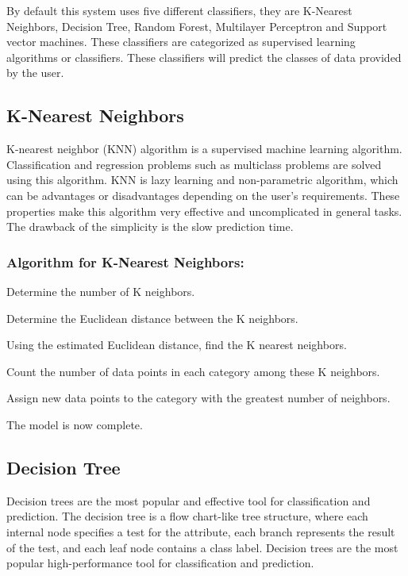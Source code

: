 By default this system uses five different classifiers, they are K-Nearest Neighbors, Decision Tree, Random Forest, Multilayer Perceptron and Support vector machines. These classifiers are categorized as supervised learning algorithms or classifiers. These classifiers will predict the classes of data provided by the user.

\subsection{K-Nearest Neighbors} \label{subsec:K_nearest_neighbors}

K-nearest neighbor (KNN) algorithm is a supervised machine learning algorithm. Classification and regression problems such as multiclass problems are solved using this algorithm. KNN is lazy learning and non-parametric algorithm, which can be advantages or disadvantages depending on the user's requirements. These properties make this algorithm very effective and uncomplicated in general tasks. The drawback of the simplicity is the slow prediction time.

\subsubsection{Algorithm for K-Nearest Neighbors:}
\begin{steps}
  \vspace{-0.5em}
  \setlength{\itemsep}{-0.2em}
  \item Determine the number of K neighbors.
  \item Determine the Euclidean distance between the K neighbors.
  \item Using the estimated Euclidean distance, find the K nearest neighbors.
  \item Count the number of data points in each category among these K neighbors.
  \item Assign new data points to the category with the greatest number of neighbors.
  \item The model is now complete.
  \vspace{-1em}
\end{steps}

\subsection{Decision Tree} \label{subsec:decision_tree}
Decision trees are the most popular and effective tool for classification and prediction. The decision tree is a flow chart-like tree structure, where each internal node specifies a test for the attribute, each branch represents the result of the test, and each leaf node contains a class label. Decision trees are the most popular high-performance tool for classification and prediction.

